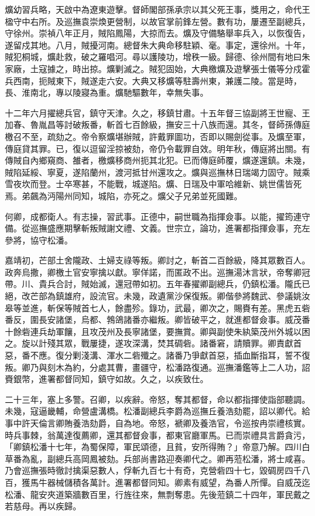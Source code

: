 \begin{pinyinscope}
爌幼習兵略，天啟中為遼東遊擊。督師閣部孫承宗以其父死王事，獎用之，命代王楹守中右所。及巡撫袁崇煥更營制，以故官掌前鋒左營。數有功，屢遷至副總兵，守徐州。崇禎八年正月，賊陷鳳陽，大掠而去。爌及守備駱舉率兵入，以恢復告，遂留戍其地。八月，賊擾河南。總督朱大典命移駐穎、毫。事定，還徐州。十年，賊犯桐城，爌赴救，破之羅唱河。尋以護陵功，增秩一級。歸德、徐州間有地曰朱家廠，土寇據之，時出掠。爌剿滅之。賊犯固始，大典檄爌及遊擊張士儀等分戍霍兵西南，扼賊東下，賊遂走六安。大典又移爌等駐壽州東，兼護二陵。當是時，長、淮南北，專以陵寢為重。爌馳驅數年，幸無失事。

十二年六月擢總兵官，鎮守天津。久之，移鎮甘肅。十五年督三協副將王世寵、王加春、魯胤昌等討破叛番，斬首七百餘級，撫安三十八族而還。其冬，督師孫傳庭檄召不至，疏劾之。帝令察爌堪辦賊，許戴罪圖功，否即以賜劍從事。及爌至軍，傳庭貸其罪。已，復以逗留淫掠被劾，帝仍令載罪自效。明年秋，傳庭將出關。有傳賊自內鄉窺商、雒者，檄爌移商州扼其北犯。已而傳庭師覆，爌遂還鎮。未幾，賊陷延綏、寧夏，遂陷蘭州，渡河抵甘州還攻之。爌與巡撫林日瑞竭力固守。賊乘雪夜坎而登。士卒寒甚，不能戰，城遂陷。爌、日瑞及中軍哈維新、姚世儒皆死焉。弟飆為沔陽州同知，城陷，亦死之。爌父子兄弟並死國難。

何卿，成都衛人。有志操，習武事。正德中，嗣世職為指揮僉事。以能，擢筠連守備。從巡撫盛應期擊斬叛賊謝文禮、文義。世宗立，論功，進署都指揮僉事，充左參將，協守松潘。

嘉靖初，芒部土舍隴政、土婦支祿等叛。卿討之，斬首二百餘級，降其眾數百人。政奔烏撒，卿檄土官安寧擒以獻。寧佯諾，而匿政不出。巡撫湯沐言狀，帝奪卿冠帶。川、貴兵合討，賊始滅，還冠帶如初。五年春擢卿副總兵，仍鎮松潘。隴氏已絕，改芒部為鎮雄府，設流官。未幾，政遺黨沙保復叛。卿偕參將魏武、參議姚汝皋等並進，斬保等賊首七人，餘盡殄。錄功，武最，卿次之，賜賚有差。黑虎五砦番反，圍長安諸堡，烏都、鵓鴿諸番亦繼叛。卿皆破平之，就進都督僉事。威茂番十餘砦連兵劫軍饟，且攻茂州及長寧諸堡，要撫賞。卿與副使朱紈築茂州外城以困之。旋以計殘其眾，戰屢捷，遂攻深溝，焚其碉砦。諸番窘，請贖罪。卿責獻首惡，番不應。復分剿淺溝、渾水二砦殲之。諸番乃爭獻首惡，插血斷指耳，誓不復叛。卿乃與刻木為約，分處其曹，畫疆守，松潘路復通。巡撫潘鑑等上二人功，詔賚銀幣，進署都督同知，鎮守如故。久之，以疾致仕。

二十三年，塞上多警。召卿，以疾辭。帝怒，奪其都督，命以都指揮使詣部聽調。未幾，寇逼畿輔，命營盧溝橋。松潘副總兵李爵為巡撫丘養浩劾罷，詔以卿代。給事中許天倫言卿賄養浩劾爵，自為地。帝怒，褫卿及養浩官，令巡按冉崇禮核實。時兵事棘，翁萬達復薦卿，還其都督僉事，都東官廳軍馬。已而崇禮具言爵貪污，「卿鎮松潘十七年，為蜀保障，軍民頌德，且貧，安所得賄？」帝意乃解。四川白草番為亂，副總兵高岡鳳被劾。兵部尚書路迎奏卿代之。卿再蒞松潘，將士咸喜。乃會巡撫張時徹討擒渠惡數人，俘斬九百七十有奇，克營砦四十七，毀碉房四千八百，獲馬牛器械儲積各萬計。進署都督同知。卿素有威望，為番人所憚。自威茂迄松潘、龍安夾道築牆數百里，行旌往來，無剽奪患。先後蒞鎮二十四年，軍民戴之若慈母。再以疾歸。


\end{pinyinscope}
